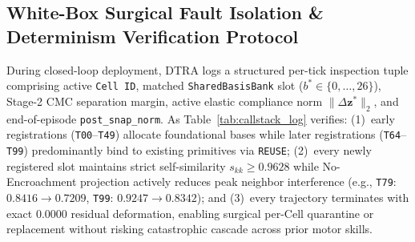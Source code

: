 \documentclass[10pt]{article}
\begin{document}
\subsection{White-Box Surgical Fault Isolation \& Determinism Verification Protocol}
During closed-loop deployment, DTRA logs a structured per-tick inspection tuple comprising active \texttt{Cell ID}, matched \texttt{SharedBasisBank} slot ($b^* \in \{0,\dots,26\}$), Stage-2 CMC separation margin, active elastic compliance norm $\|\Delta\mathbf{z}^*\|_2$, and end-of-episode \texttt{post\_snap\_norm}. As Table~\ref{tab:callstack_log} verifies: (1)~early registrations (\texttt{T00}--\texttt{T49}) allocate foundational bases while later registrations (\texttt{T64}--\texttt{T99}) predominantly bind to existing primitives via \texttt{REUSE}; (2)~every newly registered slot maintains strict self-similarity $s_{kk} \ge 0.9628$ while No-Encroachment projection actively reduces peak neighbor interference (e.g., \texttt{T79}: $0.8416 \to 0.7209$, \texttt{T99}: $0.9247 \to 0.8342$); and (3)~every trajectory terminates with exact $0.0000$ residual deformation, enabling surgical per-Cell quarantine or replacement without risking catastrophic cascade across prior motor skills.
\end{document}
